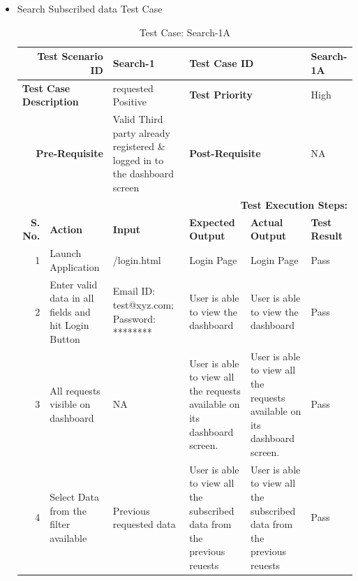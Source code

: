 \documentclass[a4paper, hidelinks, 12pt]{report}
\begin{document}
\begin{itemize}
\item{Search Subscribed data Test Case}
\begin{table}[H]
  \centering
  \caption{Test Case: Search-1A}
    \begin{tabular}{|r|p{4.355em}|p{7.715em}|p{6.43em}|p{5.855em}|p{5.07em}|}
    \toprule
    \multicolumn{2}{|p{13.425em}|}{\textbf{Test Scenario ID}} & Search-1 & \multicolumn{2}{p{12.285em}|}{\textbf{Test Case ID}} & Search-1A \\
    \midrule
    \multicolumn{2}{|l|}{\multirow{2}[2]{*}{\textbf{Test Case Description}}} & \multirow{2}[2]{*}{requested Positive} & \multicolumn{2}{l|}{\multirow{2}[2]{*}{\textbf{Test Priority}}} & \multirow{2}[2]{*}{High} \\
    \multicolumn{2}{|l|}{} & \multicolumn{1}{l|}{} & \multicolumn{2}{l|}{} & \multicolumn{1}{l|}{} \\
    \midrule
    \multicolumn{2}{|p{13.425em}|}{\textbf{Pre-Requisite}} & Valid Third party already registered \& logged in to the dashboard screen & \multicolumn{2}{p{12.285em}|}{\textbf{Post-Requisite}} & NA \\
    \midrule
    \multicolumn{6}{p{38.495em}|}{\textbf{Test Execution Steps:}} \\
    \midrule
    \multicolumn{1}{|p{5.07em}|}{\textbf{S. No.}} & \textbf{Action } & \textbf{Input} & \textbf{Expected Output} & \textbf{Actual Output} & \textbf{Test Result} \\
    \midrule
    1     & Launch Application & /login.html & Login Page & Login Page & Pass \\
    \midrule
    2     & Enter valid data in all fields and hit Login Button & Email ID: test@xyz.com; Password: ******** & User is able to view the dashboard & User is able to view the dashboard & Pass \\
    \midrule
    3     & All requests visible on dashboard & NA    & User is able to view all the requests available on its dashboard screen. & User is able to view all the requests available on its dashboard screen. & Pass \\
    \midrule
    4     & Select Data from the filter available & Previous requested data & User is able to view all the subscribed data from the previous reuests & User is able to view all the subscribed data from the previous reuests & Pass \\
    \bottomrule
    \end{tabular}%
  \label{tab:Test Case: Search-1A}%
\end{table}%


\end{itemize}
\end{document}

